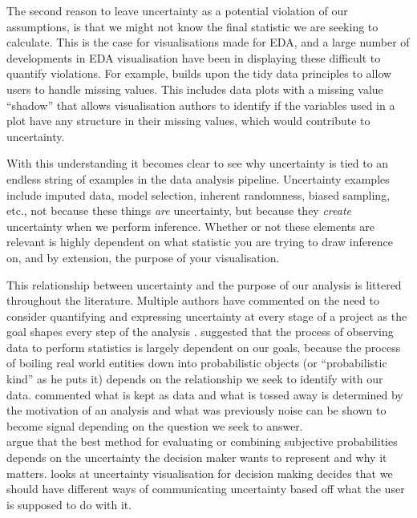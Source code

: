 \documentclass[
  12pt]{article}
\begin{document}
The second reason to leave uncertainty as a potential violation of our
assumptions, is that we might not know the final statistic we are
seeking to calculate. This is the case for visualisations made for EDA,
and a large number of developments in EDA visualisation have been in
displaying these difficult to quantify violations. For example,
\citet{Tierney2023} builds upon the tidy data principles to allow users
to handle missing values. This includes data plots with a missing value
``shadow'' that allows visualisation authors to identify if the
variables used in a plot have any structure in their missing values,
which would contribute to uncertainty.

With this understanding it becomes clear to see why uncertainty is tied
to an endless string of examples in the data analysis pipeline.
Uncertainty examples include imputed data, model selection, inherent
randomness, biased sampling, etc., not because these things \emph{are}
uncertainty, but because they \emph{create} uncertainty when we perform
inference. Whether or not these elements are relevant is highly
dependent on what statistic you are trying to draw inference on, and by
extension, the purpose of your visualisation.

This relationship between uncertainty and the purpose of our analysis is
littered throughout the literature. Multiple authors have commented on
the need to consider quantifying and expressing uncertainty at every
stage of a project as the goal shapes every step of the analysis
\citep{Kinkeldey2014, Hullman2016, Refsgaard2007}. \citet{Otsuka2023}
suggested that the process of observing data to perform statistics is
largely dependent on our goals, because the process of boiling real
world entities down into probabilistic objects (or ``probabilistic
kind'' as he puts it) depends on the relationship we seek to identify
with our data. \citet{Meng2014} commented what is kept as data and what
is tossed away is determined by the motivation of an analysis and what
was previously noise can be shown to become signal depending on the
question we seek to answer.\\
\citet{Wallsten1997} argue that the best method for evaluating or
combining subjective probabilities depends on the uncertainty the
decision maker wants to represent and why it matters.
\citet{Fischhoff2014} looks at uncertainty visualisation for decision
making decides that we should have different ways of communicating
uncertainty based off what the user is supposed to do with it.
\end{document}
